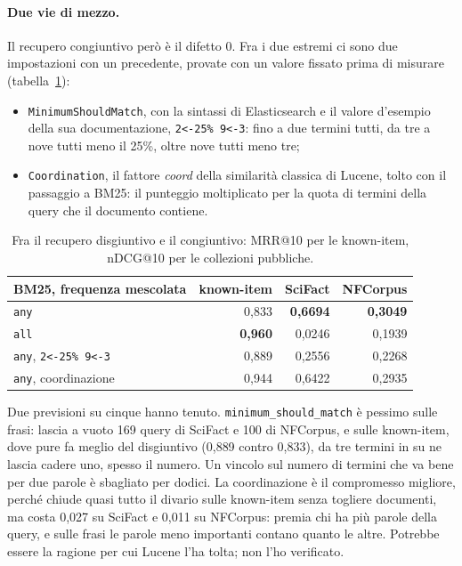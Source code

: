 \paragraph{Due vie di mezzo.} Il recupero congiuntivo però è il difetto 0. Fra i due
estremi ci sono due impostazioni con un precedente, provate con un valore fissato
prima di misurare (tabella~\ref{tab:intermedio}):
\begin{itemize}
  \item \texttt{MinimumShouldMatch}, con la sintassi di Elasticsearch e il valore
        d'esempio della sua documentazione, \texttt{2<-25\% 9<-3}: fino a due
        termini tutti, da tre a nove tutti meno il 25\%, oltre nove tutti meno tre;
  \item \texttt{Coordination}, il fattore \emph{coord} della similarità classica
        di Lucene, tolto con il passaggio a BM25: il punteggio moltiplicato per la
        quota di termini della query che il documento contiene.
\end{itemize}

\begin{table}[ht]
  \centering
  \begin{tabular}{lrrr}
    \toprule
    BM25, frequenza mescolata & known-item & SciFact & NFCorpus \\
    \midrule
    \texttt{any} & 0,833 & \textbf{0,6694} & \textbf{0,3049} \\
    \texttt{all} & \textbf{0,960} & 0,0246 & 0,1939 \\
    \texttt{any}, \texttt{2<-25\% 9<-3} & 0,889 & 0,2556 & 0,2268 \\
    \texttt{any}, coordinazione & 0,944 & 0,6422 & 0,2935 \\
    \bottomrule
  \end{tabular}
  \caption{Fra il recupero disgiuntivo e il congiuntivo: MRR@10 per le known-item,
  nDCG@10 per le collezioni pubbliche.}
  \label{tab:intermedio}
\end{table}

Due previsioni su cinque hanno tenuto. \texttt{minimum\_should\_match} è
pessimo sulle frasi: lascia a vuoto 169 query di SciFact e 100 di NFCorpus, e
sulle known-item, dove pure fa meglio del disgiuntivo (0,889 contro 0,833), da
tre termini in su ne lascia cadere uno, spesso il numero. Un
vincolo sul numero di termini che va bene per due parole è sbagliato per dodici.
La coordinazione è il compromesso migliore, perché chiude quasi tutto il divario
sulle known-item senza togliere documenti, ma costa 0,027 su SciFact e 0,011 su
NFCorpus: premia chi ha più parole della query, e sulle frasi le parole meno
importanti contano quanto le altre. Potrebbe essere la ragione per cui Lucene l'ha tolta; non l'ho verificato.

